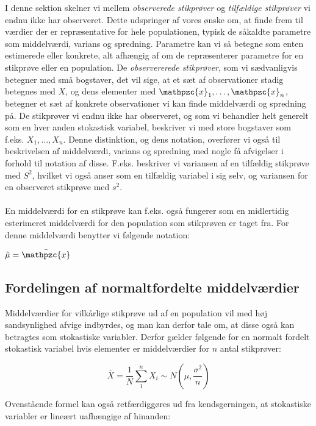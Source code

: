 \documentclass{article}
\newcommand{\mellemrum}{\vspace{2 ex}}
\newcommand{\cent}[1]{ \mellemrum \begin{center} #1\end{center} \mellemrum }
\newcommand{\centL}[1]{ \mellemrum \vspace{-20 px} \begin{center} $#1$\end{center} \mellemrum }
\newcommand{\parenthesis}[1]{\ensuremath{\left( #1 \right)}}
\newcommand{\script}[1]{\mathpzc{#1}}
\begin{document}
	I denne sektion skelner vi mellem \textit{observerede stikprøver} og \textit{tilfældige stikprøver} vi endnu ikke har observeret. Dette udspringer af vores ønske om, at finde frem til værdier der er repræsentative for hele populationen, typisk de såkaldte parametre som middelværdi, varians og spredning. Parametre kan vi så betegne som enten estimerede eller konkrete, alt afhængig af om de repræsenterer parametre for en stikprøve eller en population. De \textit{observererede stikprøver}, som vi sædvanligvis betegner med små bogstaver, det vil sige, at et sæt af observationer stadig betegnes med $X$, og dens elementer med $\script{x}_1,\dots, \script{x}_n$, betegner et sæt af konkrete observationer vi kan finde middelværdi og spredning på. De stikprøver vi endnu ikke har observeret, og som vi behandler helt generelt som en hver anden stokastisk variabel, beskriver vi med store bogstaver som f.eks. $X_1,\dots, X_n$. Denne distinktion, og dens notation, overfører vi også til beskrivelsen af middelværdi, varians og spredning med nogle få afvigelser i forhold til notation af disse. F.eks. beskriver vi variansen af en tilfældig stikprøve med $S^2$, hvilket vi også anser som en tilfældig variabel i sig selv, og variansen for en observeret stikprøve med $s^2$. \\\\
	
	En middelværdi for en stikprøve kan f.eks. også fungerer som en midlertidig esterimeret middelværdi for den population som stikprøven er taget fra. For denne middelværdi benytter vi følgende notation:
	
	\cent{$\hat{\mu} = \bar{\script{x}}$} 
	
	\subsection{Fordelingen af normaltfordelte middelværdier}
	
	Middelværdier for vilkårlige stikprøve ud af en population vil med høj sandsynlighed afvige indbyrdes, og man kan derfor tale om, at disse også kan betragtes som stokastiske variabler. Derfor gælder følgende for en normalt fordelt stokastisk variabel hvis elementer er middelværdier for $n$ antal stikprøver:
	
	
	\centL{$ \bar{X} = \frac{1}{N} \sum_{1}^{n}X_i \sim N\parenthesis{\mu,\frac{\sigma^2}{n}} $}
	
	Ovenstående formel kan også retfærdiggøres ud fra kendsgerningen, at stokastiske variabler er lineært uafhængige af hinanden:
	
\end{document}
